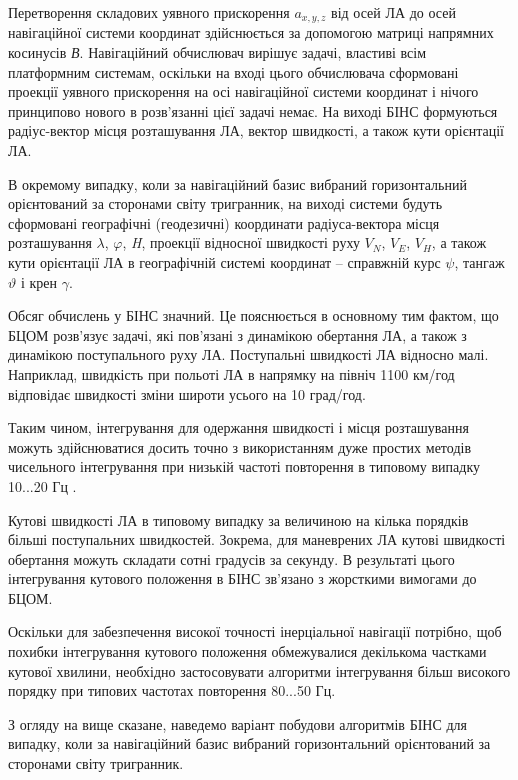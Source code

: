 Перетворення складових уявного прискорення $a_{x,y,z}$  від осей ЛА до осей навігаційної 
системи координат здійснюється за допомогою матриці напрямних  косинусів \textit{В}. Навігаційний 
обчислювач вирішує задачі, властиві всім платформним системам, оскільки на вході 
цього обчислювача сформовані проекції уявного прискорення на осі навігаційної системи 
координат і нічого принципово нового в розв'язанні цієї задачі немає. На виході БІНС 
формуються радіус-вектор місця розташування ЛА, вектор швидкості, а також кути орієнтації 
ЛА. 

В окремому випадку, коли за навігаційний базис вибраний горизонтальний орієнтований 
за сторонами світу тригранник, на виході системи будуть сформовані географічні (геодезичні) 
координати радіуса-вектора місця розташування $\lambda$, $\varphi$, \textit{H}, проекції 
відносної швидкості руху $V_N$, $V_E$, $V_H$, а також 
кути орієнтації ЛА в географічній системі координат -- справжній курс $\psi$, тангаж $\vartheta$ і 
крен $\gamma$. 

Обсяг обчислень у БІНС значний. Це пояснюється в основному тим фактом, що БЦОМ розв'язує 
задачі, які пов'язані з динамікою обертання ЛА, а також з динамікою поступального 
руху ЛА. Поступальні швидкості ЛА відносно малі. Наприклад, швидкість при польоті 
ЛА в напрямку на північ 1100 км/год відповідає швидкості зміни широти усього на 10 
град/год.

Таким чином, інтегрування для одержання швидкості і місця розташування можуть здійснюватися 
досить точно з використанням дуже простих методів чисельного інтегрування при низькій 
частоті повторення   в типовому випадку 10...20 Гц .

Кутові швидкості ЛА в типовому випадку за величиною на кілька порядків більші поступальних 
швидкостей. Зокрема, для маневрених ЛА кутові швидкості обертання можуть складати 
сотні градусів за секунду. В результаті цього інтегрування кутового положення в БІНС 
зв'язано з жорсткими вимогами до БЦОМ.

Оскільки для забезпечення високої точності інерціальної навігації потрібно, щоб похибки 
інтегрування кутового положення обмежувалися декількома частками кутової хвилини, 
необхідно застосовувати алгоритми інтегрування більш високого порядку при типових 
частотах повторення  80...50 Гц. 

З огляду на вище сказане, наведемо  варіант побудови алгоритмів БІНС для випадку, 
коли за навігаційний базис вибраний горизонтальний орієнтований за сторонами світу 
тригранник.
\vspace{5mm}

